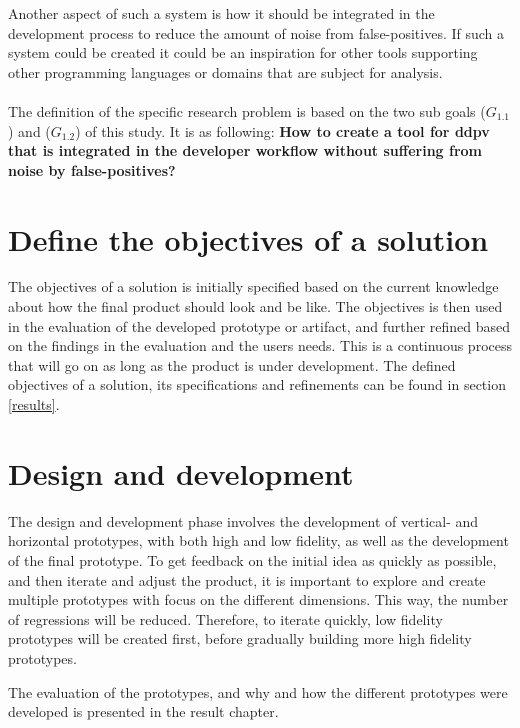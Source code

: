 \documentclass[pdftex,10pt,b5paper,twoside]{report}
\begin{document}
Another aspect of such a system is how it should be integrated in the development process to reduce the amount of noise from false-positives. If such a system could be created it could be an inspiration for other tools supporting other programming languages or domains that are subject for analysis. \\

\\ The definition of the specific research problem is based on the two sub goals (\(G_{1.1}\)) and (\(G_{1.2}\)) of this study. It is as following: \textbf{How to create a tool for \gls{ddpv} that is integrated in the developer workflow without suffering from noise by false-positives?}

\section{Define the objectives of a solution}
\label{objectives-of-solution}
The objectives of a solution is initially specified based on the current knowledge about how the final product should look and be like. The objectives is then used in the evaluation of the developed prototype or artifact, and further refined based on the findings in the evaluation and the users needs. This is a continuous process that will go on as long as the product is under development. The defined objectives of a solution, its specifications and refinements can be found in section \ref{results}.

\section{Design and development}
\label{design-development}

The design and development phase involves the development of vertical- and horizontal prototypes, with both high and low fidelity, as well as the development of the final prototype. To get feedback on the initial idea as quickly as possible, and then iterate and adjust the product, it is important to explore and create multiple prototypes with focus on the different dimensions. This way, the number of regressions will be reduced. Therefore, to iterate quickly, low fidelity prototypes will be created first, before gradually building more high fidelity prototypes.

The evaluation of the prototypes, and why and how the different prototypes were developed is presented in the result chapter. 
\end{document}
